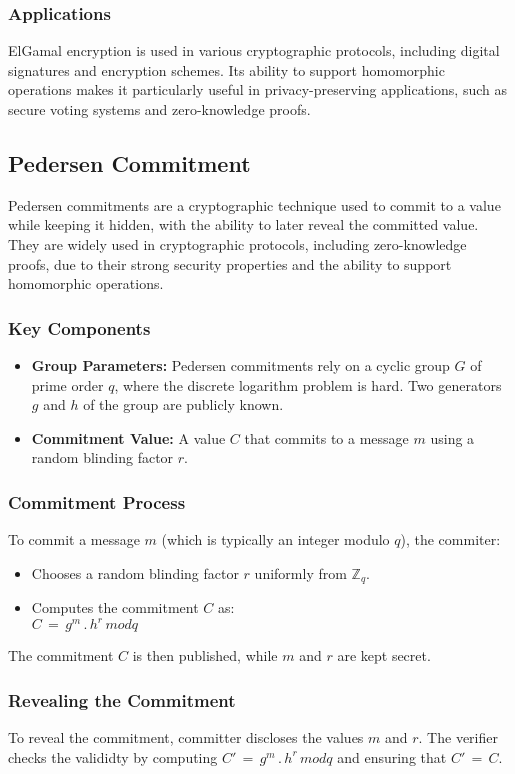 \documentclass[12pt,a4paper]{report}
\begin{document}
\subsubsection{Applications}
ElGamal encryption is used in various cryptographic protocols, including digital signatures and encryption schemes. 
Its ability to support homomorphic operations makes it particularly useful in privacy-preserving applications, 
such as secure voting systems and zero-knowledge proofs.
\subsection{Pedersen Commitment}
Pedersen commitments are a cryptographic technique used to commit to a value 
while keeping it hidden, with the ability to later reveal the committed value. 
They are widely used in cryptographic protocols, including zero-knowledge proofs, 
due to their strong security properties and the ability to support homomorphic operations.
\subsubsection{Key Components}
\begin{itemize}
	\item \textbf{Group Parameters:} Pedersen commitments rely on a cyclic group $G$ of prime order $q$, where the discrete logarithm problem is hard. Two generators $g$ and $h$ of the group are publicly known.
	\item \textbf{Commitment Value:} A value $C$ that commits to a message $m$ using a random blinding factor $r$.
\end{itemize}
\subsubsection{Commitment Process}
To commit a message $m$ (which is typically an integer modulo $q$), the commiter:
\begin{itemize}
	\item Chooses a random blinding factor $r$ uniformly from $\mathbb{Z}_q$.
	\item Computes the commitment $C$ as:\\ $C\,=\,g^m\,.\,h^r\,modq$
\end{itemize}
The commitment $C$ is then published, while $m$ and $r$ are kept secret.
\subsubsection{Revealing the Commitment}
To reveal the commitment, committer discloses the values $m$ and $r$. The verifier checks the valididty by computing $C'\,=\,g^m\,.\,h^r\,modq$ and ensuring that $C'\,=\,C$.
\end{document}
